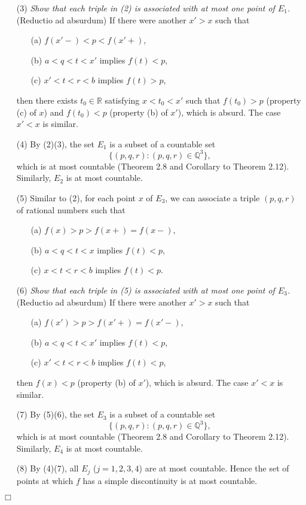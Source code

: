 \documentclass{article}
\begin{document}
\begin{enumerate}
  \item[(3)]
  \emph{Show that each triple in (2) is associated with at most one point of $E_1$.}
  (Reductio ad absurdum)
  If there were another $x' > x$ such that
  \begin{enumerate}
    \item[(a)]
    $f(x'-) < p < f(x'+)$,
    \item[(b)]
    $a < q < t < x'$ implies $f(t) < p$,
    \item[(c)]
    $x' < t < r < b$ implies $f(t) > p$,
  \end{enumerate}
  then there exists $t_0 \in \mathbb{R}$ satisfying $x < t_0 < x'$
  such that $f(t_0) > p$ (property (c) of $x$) and $f(t_0) < p$ (property (b) of $x'$),
  which is absurd.
  The case $x' < x$ is similar.

  \item[(4)]
  By (2)(3), the set $E_1$ is a subset of a countable set
  \[
    \{ (p,q,r) : (p,q,r) \in \mathbb{Q}^3 \},
  \]
  which is at most countable (Theorem 2.8 and Corollary to Theorem 2.12).
  Similarly, $E_2$ is at most countable.

  \item[(5)]
  Similar to (2), for each point $x$ of $E_3$,
  we can associate a triple $(p,q,r)$ of rational numbers such that
  \begin{enumerate}
    \item[(a)]
    $f(x) > p > f(x+) = f(x-)$,
    \item[(b)]
    $a < q < t < x$ implies $f(t) < p$,
    \item[(c)]
    $x < t < r < b$ implies $f(t) < p$.
  \end{enumerate}

  \item[(6)]
  \emph{Show that each triple in (5) is associated with at most one point of $E_3$.}
  (Reductio ad absurdum)
  If there were another $x' > x$ such that
  \begin{enumerate}
    \item[(a)]
    $f(x') > p > f(x'+) = f(x'-)$,
    \item[(b)]
    $a < q < t < x'$ implies $f(t) < p$,
    \item[(c)]
    $x' < t < r < b$ implies $f(t) < p$,
  \end{enumerate}
  then $f(x) < p$ (property (b) of $x'$), which is absurd.
  The case $x' < x$ is similar.

  \item[(7)]
  By (5)(6), the set $E_3$ is a subset of a countable set
  \[
    \{ (p,q,r) : (p,q,r) \in \mathbb{Q}^3 \},
  \]
  which is at most countable (Theorem 2.8 and Corollary to Theorem 2.12).
  Similarly, $E_4$ is at most countable.

  \item[(8)]
  By (4)(7), all $E_j$ ($j=1,2,3,4$) are at most countable.
  Hence the set of points at which $f$ has a simple discontinuity is at most countable.
\end{enumerate}
$\Box$ \\\\
\end{document}
